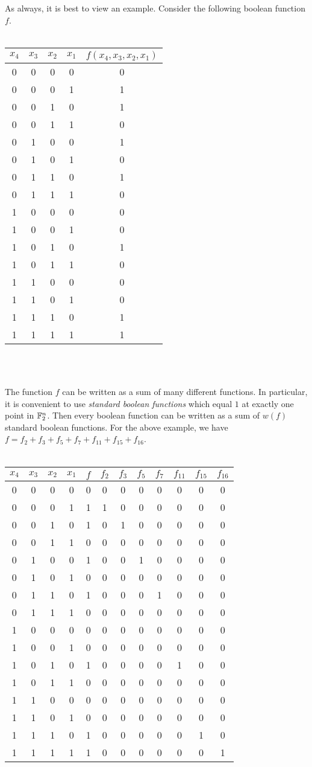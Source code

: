 \par As always, it is best to view an example. Consider the following boolean function
$f$.
\\
\\
\begin{tabular}{|c|c|c|c|c|}
  \hline
  $x_4$&$x_3$&$x_2$&$x_1$&$f(x_4,x_3,x_2,x_1)$\\
  \hline
  0&0&0&0&0\\
  0&0&0&1&1\\
  0&0&1&0&1\\
  0&0&1&1&0\\
  0&1&0&0&1\\
  0&1&0&1&0\\
  0&1&1&0&1\\
  0&1&1&1&0\\
  1&0&0&0&0\\
  1&0&0&1&0\\
  1&0&1&0&1\\
  1&0&1&1&0\\
  1&1&0&0&0\\
  1&1&0&1&0\\
  1&1&1&0&1\\
  1&1&1&1&1\\
  \hline
\end{tabular}
\\
\\
\par The function $f$ can be written as a sum of many different functions.
In particular, it is convenient to use {\em standard boolean functions} which
equal $1$ at exactly one point in $\mathbb{F}_2^n$. Then every boolean function can
be written as a sum of $w(f)$ standard boolean functions. For the above example,
we have $f=f_2+f_3+f_5+f_7+f_{11}+f_{15}+f_{16}$.
\\
\\
\begin{tabular}{|c|c|c|c|c|c|c|c|c|c|c|c|}
  \hline
  $x_4$&$x_3$&$x_2$&$x_1$&$f$&$f_2$&$f_3$&$f_5$&$f_7$&$f_{11}$&$f_{15}$&$f_{16}$\\
  \hline
  0&0&0&0&0&0&0&0&0&0&0&0\\
  0&0&0&1&1&1&0&0&0&0&0&0\\
  0&0&1&0&1&0&1&0&0&0&0&0\\
  0&0&1&1&0&0&0&0&0&0&0&0\\
  0&1&0&0&1&0&0&1&0&0&0&0\\
  0&1&0&1&0&0&0&0&0&0&0&0\\
  0&1&1&0&1&0&0&0&1&0&0&0\\
  0&1&1&1&0&0&0&0&0&0&0&0\\
  1&0&0&0&0&0&0&0&0&0&0&0\\
  1&0&0&1&0&0&0&0&0&0&0&0\\
  1&0&1&0&1&0&0&0&0&1&0&0\\
  1&0&1&1&0&0&0&0&0&0&0&0\\
  1&1&0&0&0&0&0&0&0&0&0&0\\
  1&1&0&1&0&0&0&0&0&0&0&0\\
  1&1&1&0&1&0&0&0&0&0&1&0\\
  1&1&1&1&1&0&0&0&0&0&0&1\\
  \hline
\end{tabular}
